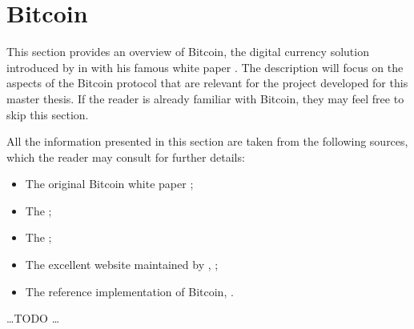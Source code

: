 \section{Bitcoin}\label{sec:bitcoin}

This section provides an overview of Bitcoin, the digital currency solution
introduced by \citeauthor{whitepaper} in \citeyear{whitepaper} with his famous
white paper \cite{whitepaper}. The description will focus on the aspects of the
Bitcoin protocol that are relevant for the project developed for this master
thesis. If the reader is already familiar with Bitcoin, they may feel free to
skip this section.

All the information presented in this section are taken from the following
sources, which the reader may consult for further details:
\begin{itemize}
	\item The original Bitcoin white paper \cite{whitepaper};
	\item The  \cite{bitcoin-wiki};
	\item The  \cite{bitcoin-dev};
	\item The excellent website maintained by \citeauthor{learnmeabitcoin},
		 \cite{learnmeabitcoin};
	\item The reference implementation of Bitcoin, 
		\cite{bitcoin-core}.
\end{itemize}

\ldots TODO \ldots
